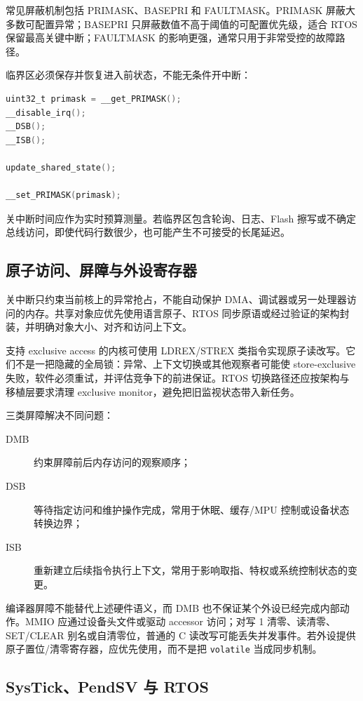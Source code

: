 常见屏蔽机制包括 PRIMASK、BASEPRI 和 FAULTMASK。PRIMASK 屏蔽大多数可配置异常；BASEPRI 只屏蔽数值不高于阈值的可配置优先级，适合 RTOS 保留最高关键中断；FAULTMASK 的影响更强，通常只用于非常受控的故障路径。

临界区必须保存并恢复进入前状态，不能无条件开中断：
\begin{lstlisting}[language=C,caption={保存和恢复中断屏蔽状态}]
uint32_t primask = __get_PRIMASK();
__disable_irq();
__DSB();
__ISB();

update_shared_state();

__set_PRIMASK(primask);
\end{lstlisting}

关中断时间应作为实时预算测量。若临界区包含轮询、日志、Flash 擦写或不确定总线访问，即使代码行数很少，也可能产生不可接受的长尾延迟。

\subsection{原子访问、屏障与外设寄存器}

关中断只约束当前核上的异常抢占，不能自动保护 DMA、调试器或另一处理器访问的内存。共享对象应优先使用语言原子、RTOS 同步原语或经过验证的架构封装，并明确对象大小、对齐和访问上下文。

支持 exclusive access 的内核可使用 LDREX/STREX 类指令实现原子读改写。它们不是一把隐藏的全局锁：异常、上下文切换或其他观察者可能使 store-exclusive 失败，软件必须重试，并评估竞争下的前进保证。RTOS 切换路径还应按架构与移植层要求清理 exclusive monitor，避免把旧监视状态带入新任务。

三类屏障解决不同问题：
\begin{description}
  \item[DMB] 约束屏障前后内存访问的观察顺序；
  \item[DSB] 等待指定访问和维护操作完成，常用于休眠、缓存/MPU 控制或设备状态转换边界；
  \item[ISB] 重新建立后续指令执行上下文，常用于影响取指、特权或系统控制状态的变更。
\end{description}

编译器屏障不能替代上述硬件语义，而 DMB 也不保证某个外设已经完成内部动作。MMIO 应通过设备头文件或驱动 accessor 访问；对写 1 清零、读清零、SET/CLEAR 别名或自清零位，普通的 C 读改写可能丢失并发事件。若外设提供原子置位/清零寄存器，应优先使用，而不是把 \texttt{volatile} 当成同步机制。

\subsection{SysTick、PendSV 与 RTOS}

